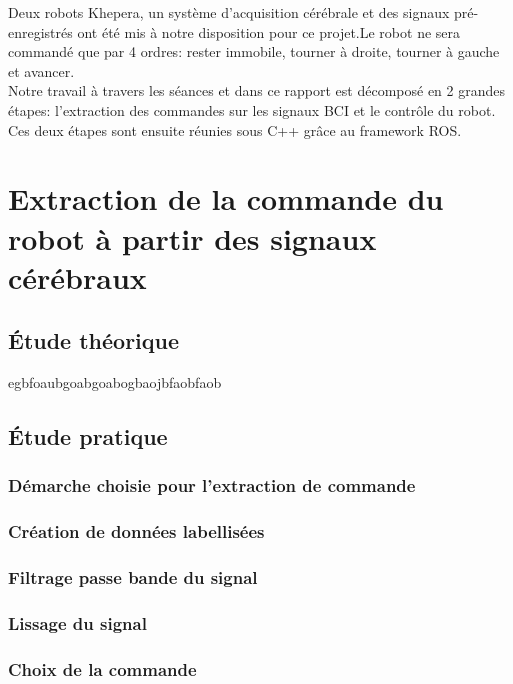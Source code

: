\documentclass[11pt]{article}
\begin{document}
\noindent Deux robots Khepera, un système d'acquisition cérébrale et des signaux pré-enregistrés ont été mis à notre disposition pour ce projet.Le robot ne sera commandé que par 4 ordres: rester immobile, tourner à droite, tourner à gauche et avancer.\\

\noindent Notre travail à travers les séances et dans ce rapport est décomposé en 2 grandes étapes: l'extraction des commandes sur les signaux BCI et le contrôle du robot. Ces deux étapes sont ensuite réunies sous C++ grâce au framework ROS.


\cleardoublepage


\section{Extraction de la commande du robot à partir des signaux cérébraux}

\subsection{Étude théorique}
egbfoaubgoabgoabogbaojbfaobfaob



\cleardoublepage

\subsection{Étude pratique}
\subsubsection{Démarche choisie pour l'extraction de commande}
\subsubsection{Création de données labellisées}
\subsubsection{Filtrage passe bande du signal}
\subsubsection{Lissage du signal}
\subsubsection{Choix de la commande}
\end{document}
